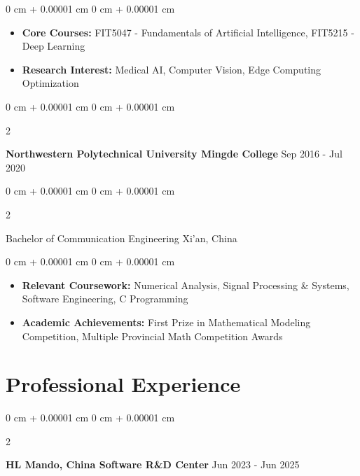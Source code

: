 \documentclass[10pt, a4paper]{article}
\newenvironment{highlights}{
    \begin{itemize}[
        topsep=0.15 cm,
        parsep=0.08 cm,
        partopsep=0pt,
        itemsep=0.05 cm,
        leftmargin=0 cm + 10pt
    ]
}{
    \end{itemize}
} %
\newenvironment{onecolentry}{
    \begin{adjustwidth}{
        0 cm + 0.00001 cm
    }{
        0 cm + 0.00001 cm
    }
}{
    \end{adjustwidth}
} %
\newenvironment{twocolentry}[2][]{
    \onecolentry
    \def\secondColumn{#2}
    \setcolumnwidth{\fill, 4.5 cm}
    \begin{paracol}{2}
}{
    \switchcolumn \raggedleft \secondColumn
    \end{paracol}
    \endonecolentry
} %
\begin{document}
        \vspace{0.10 cm}
        \begin{onecolentry}
            \begin{highlights}
                \item \textbf{Core Courses:} FIT5047 - Fundamentals of Artificial Intelligence, FIT5215 - Deep Learning
                \item \textbf{Research Interest:} Medical AI, Computer Vision, Edge Computing Optimization
            \end{highlights}
        \end{onecolentry}

        \vspace{0.2 cm}

        \begin{twocolentry}{
            Sep 2016 - Jul 2020
        }
            \textbf{Northwestern Polytechnical University Mingde College}\end{twocolentry}

        \begin{twocolentry}{
            Xi'an, China
        }
            Bachelor of Communication Engineering\end{twocolentry}

        \vspace{0.10 cm}
        \begin{onecolentry}
            \begin{highlights}
                \item \textbf{Relevant Coursework:} Numerical Analysis, Signal Processing \& Systems, Software Engineering, C Programming
                \item \textbf{Academic Achievements:} First Prize in Mathematical Modeling Competition, Multiple Provincial Math Competition Awards
            \end{highlights}
        \end{onecolentry}



    
    \section{Professional Experience}

        \begin{twocolentry}{
            Jun 2023 - Jun 2025
        }
            \textbf{HL Mando, China Software R\&D Center}\end{twocolentry}
\end{document}
